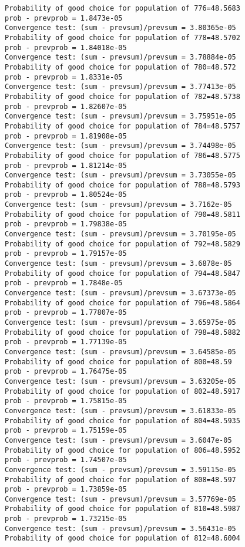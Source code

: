 \documentclass[11pt,onecolumn]{article}
\begin{document}
\begin{verbatim}
Probability of good choice for population of 776=48.5683
prob - prevprob = 1.8473e-05
Convergence test: (sum - prevsum)/prevsum = 3.80365e-05
Probability of good choice for population of 778=48.5702
prob - prevprob = 1.84018e-05
Convergence test: (sum - prevsum)/prevsum = 3.78884e-05
Probability of good choice for population of 780=48.572
prob - prevprob = 1.8331e-05
Convergence test: (sum - prevsum)/prevsum = 3.77413e-05
Probability of good choice for population of 782=48.5738
prob - prevprob = 1.82607e-05
Convergence test: (sum - prevsum)/prevsum = 3.75951e-05
Probability of good choice for population of 784=48.5757
prob - prevprob = 1.81908e-05
Convergence test: (sum - prevsum)/prevsum = 3.74498e-05
Probability of good choice for population of 786=48.5775
prob - prevprob = 1.81214e-05
Convergence test: (sum - prevsum)/prevsum = 3.73055e-05
Probability of good choice for population of 788=48.5793
prob - prevprob = 1.80524e-05
Convergence test: (sum - prevsum)/prevsum = 3.7162e-05
Probability of good choice for population of 790=48.5811
prob - prevprob = 1.79838e-05
Convergence test: (sum - prevsum)/prevsum = 3.70195e-05
Probability of good choice for population of 792=48.5829
prob - prevprob = 1.79157e-05
Convergence test: (sum - prevsum)/prevsum = 3.6878e-05
Probability of good choice for population of 794=48.5847
prob - prevprob = 1.7848e-05
Convergence test: (sum - prevsum)/prevsum = 3.67373e-05
Probability of good choice for population of 796=48.5864
prob - prevprob = 1.77807e-05
Convergence test: (sum - prevsum)/prevsum = 3.65975e-05
Probability of good choice for population of 798=48.5882
prob - prevprob = 1.77139e-05
Convergence test: (sum - prevsum)/prevsum = 3.64585e-05
Probability of good choice for population of 800=48.59
prob - prevprob = 1.76475e-05
Convergence test: (sum - prevsum)/prevsum = 3.63205e-05
Probability of good choice for population of 802=48.5917
prob - prevprob = 1.75815e-05
Convergence test: (sum - prevsum)/prevsum = 3.61833e-05
Probability of good choice for population of 804=48.5935
prob - prevprob = 1.75159e-05
Convergence test: (sum - prevsum)/prevsum = 3.6047e-05
Probability of good choice for population of 806=48.5952
prob - prevprob = 1.74507e-05
Convergence test: (sum - prevsum)/prevsum = 3.59115e-05
Probability of good choice for population of 808=48.597
prob - prevprob = 1.73859e-05
Convergence test: (sum - prevsum)/prevsum = 3.57769e-05
Probability of good choice for population of 810=48.5987
prob - prevprob = 1.73215e-05
Convergence test: (sum - prevsum)/prevsum = 3.56431e-05
Probability of good choice for population of 812=48.6004

\end{verbatim}
\end{document}

